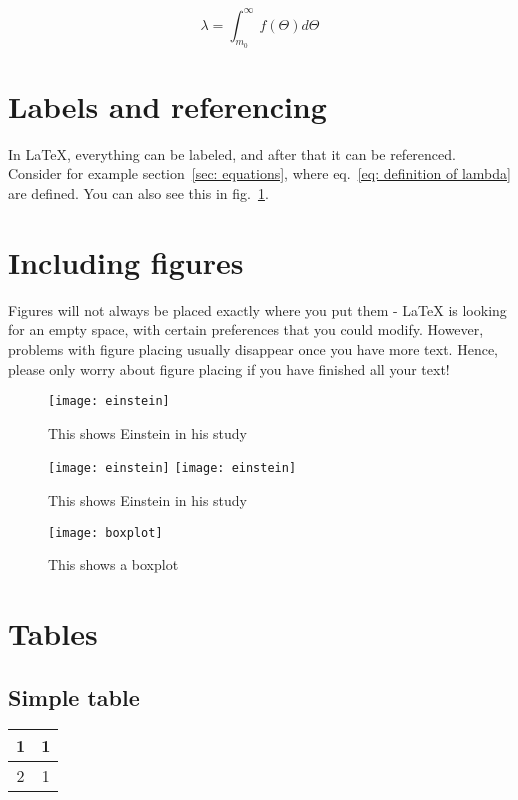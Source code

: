 \documentclass{article}
\begin{document}
\begin{equation}\label{eq: definition of lambda}
\lambda = \int_{m_0}^\infty f(\Theta) d \Theta
\end{equation}


\section{Labels and referencing}

In LaTeX, everything can be labeled, and after that it can be referenced. Consider for example section~\ref{sec: equations}, where eq.~\ref{eq: definition of lambda} are defined. You can also see this in fig.~\ref{fig: einstein}.

\section{Including figures}

Figures will not always be placed exactly where you put them - LaTeX is looking for an empty space, with certain preferences that you could modify. However, problems with figure placing usually disappear once you have more text. Hence, please only worry about figure placing if you have finished all your text!


\begin{figure}
\centering
\texttt{[image: einstein]} %
\caption{This shows Einstein in his study}\label{fig: einstein}
\end{figure}  

\begin{figure}
\centering
\texttt{[image: einstein]}
\texttt{[image: einstein]}
\caption{This shows Einstein in his study}\label{fig: einstein2}
\end{figure}  



\begin{figure}
\centering
\texttt{[image: boxplot]} %
\caption{This shows a boxplot}\label{fig: boxplot}
\end{figure} 

\section{Tables}

\subsection{Simple table}
\begin{tabular}{|c|c|}
\hline 
1 & 1 \\ 
\hline 
2 & 1 \\ 
\hline 
\end{tabular} 
\end{document}
